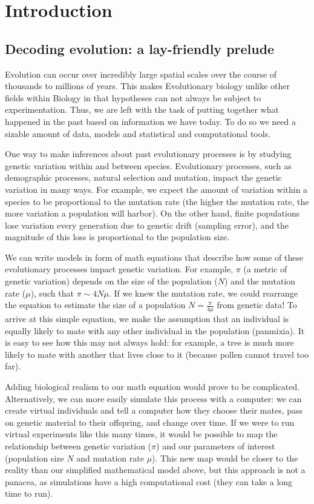 \chapter{Introduction}

\section{Decoding evolution: a lay-friendly prelude}
Evolution can occur over incredibly large spatial scales over the course of thousands to millions of years.
This makes Evolutionary biology unlike other fields within Biology in that hypotheses can not always be subject to experimentation.
Thus, we are left with the task of putting together what happened in the past based on information we have today.
To do so we need a sizable amount of data, models and statistical and computational tools.

One way to make inferences about past evolutionary processes is by studying genetic variation within and between species.
Evolutionary processes, such as demographic processes, natural selection and mutation, impact the genetic variation in many ways.
For example, we expect the amount of variation within a species to be proportional to the mutation rate (\ie the higher the mutation rate, the more variation a population will harbor).
On the other hand, finite populations lose variation every generation due to genetic drift (\ie sampling error), 
and the magnitude of this loss is proportional to the population size.

We can write models in form of math equations that describe how some of these evolutionary processes impact genetic variation.
For example, $\pi$ (a metric of genetic variation) depends on the size of the population ($N$) and the mutation rate ($\mu$), such that $\pi \sim 4N\mu$.
If we knew the mutation rate, we could rearrange the equation to estimate the size of a population $N = \frac{\pi}{4\mu}$ from genetic data!
To arrive at this simple equation, we make the assumption that an individual is equally likely to mate with any other individual in the population (\ie panmixia).
It is easy to see how this may not always hold:
for example, a tree is much more likely to mate with another that lives close to it (because pollen cannot travel too far).

Adding biological realism to our math equation would prove to be complicated.
Alternatively, we can more easily simulate this process with a computer:
we can create virtual individuals and tell a computer how they choose their mates, pass on genetic material to their offspring, and change over time.
If we were to run virtual experiments like this many times,
it would be possible to map the relationship between genetic variation ($\pi$) and our parameters of interest (population size $N$ and mutation rate $\mu$).
This new map would be closer to the reality than our simplified mathematical model above,
but this approach is not a panacea, as simulations have a high computational cost (\ie they can take a long time to run).

